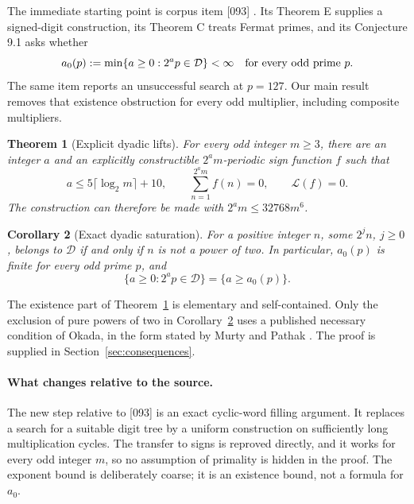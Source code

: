 \documentclass[11pt,a4paper]{article}
\newtheorem{theorem}{Theorem}[section]
\newtheorem{corollary}[theorem]{Corollary}
\theoremstyle{definition}\newtheorem{definition}[theorem]{Definition}
\theoremstyle{remark}\newtheorem{remark}[theorem]{Remark}
\newcommand{\Dset}{\mathcal D}\newcommand{\wt}{\operatorname{wt}}
\newcommand{\LL}{\mathcal L}\newcommand{\UU}{\mathcal U}
\begin{document}
The immediate starting point is corpus item [093] \cite{Corpus093}.
Its Theorem E supplies a signed-digit construction, its Theorem C treats
Fermat primes, and its Conjecture 9.1 asks whether
\[
 a_0(p):=\min\{a\ge0:2^ap\in\Dset\}<\infty
 \quad\hbox{for every odd prime }p.
\]
The same item reports an unsuccessful search at $p=127$. Our main result
removes that existence obstruction for every odd multiplier, including
composite multipliers.

\begin{theorem}[Explicit dyadic lifts]\label{thm:main}
For every odd integer $m\ge3$, there are an integer $a$ and an explicitly
constructible $2^am$-periodic sign function $f$ such that
\begin{equation}\label{eq:main}
 a\le5\lceil\log_2m\rceil+10,\qquad
 \sum_{n=1}^{2^am}f(n)=0,\qquad \LL(f)=0.
\end{equation}
The construction can therefore be made with $2^am\le32768m^6$.
\end{theorem}

\begin{corollary}[Exact dyadic saturation]\label{cor:saturation}
For a positive integer $n$, some $2^jn$, $j\ge0$, belongs to $\Dset$
if and only if $n$ is not a power of two. In particular, $a_0(p)$ is
finite for every odd prime $p$, and
\[
 \{a\ge0:2^ap\in\Dset\}=\{a\ge a_0(p)\}.
\]
\end{corollary}

The existence part of Theorem~\ref{thm:main} is elementary and
self-contained. Only the exclusion of pure powers of two in
Corollary~\ref{cor:saturation} uses a published necessary condition of
Okada, in the form stated by Murty and Pathak \cite[Theorem 1.1]{MP2022}.
The proof is supplied in Section~\ref{sec:consequences}.

\paragraph{What changes relative to the source.}
The new step relative to [093] is an exact cyclic-word filling argument.
It replaces a search for a suitable digit tree by a uniform construction
on sufficiently long multiplication cycles. The transfer to signs is
reproved directly, and it works for every odd integer $m$, so no
assumption of primality is hidden in the proof. The exponent bound is
deliberately coarse; it is an existence bound, not a formula for $a_0$.
\end{document}
